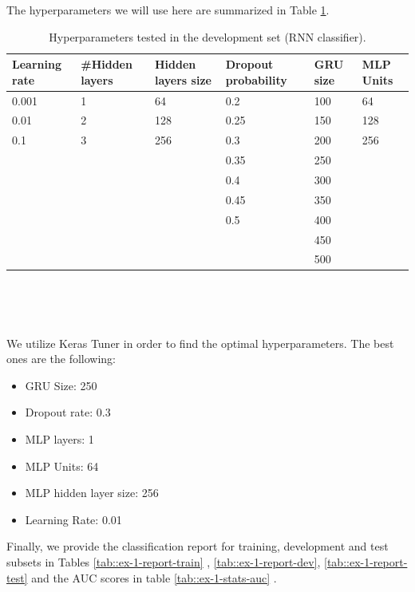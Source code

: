 \documentclass[10pt, a4paper]{article}
\begin{document}
	The hyperparameters we will use here are summarized in Table \ref{tab::ex-1-hyper}.
	
	\begin{table}
		\centering
		\begin{tabular}{|l|l|l|l|l|l|}
			\hline
			\rowcolor{blue!25}\textbf{Learning rate} & \cellcolor{blue!25}\textbf{\#Hidden layers} & \cellcolor{blue!25}\textbf{Hidden layers size} & \cellcolor{blue!25}\textbf{Dropout probability} & \cellcolor{blue!25}\textbf{GRU size}  & \cellcolor{blue!25}\textbf{MLP Units}\\
			\hline
			0.001 & 1 & 64 & 0.2 & 100 & 64\\
			\hline
			0.01 & 2 & 128 & 0.25 & 150 & 128\\
			\hline
			0.1 & 3 & 256 & 0.3 & 200 & 256 \\
			\hline 
			& & & 0.35 & 250 & \\
			\hline 
			& & & 0.4 & 300 &\\
			\hline 
			& & & 0.45 & 350 &\\
			\hline 
			& & & 0.5 & 400 &\\
			\hline 
			& & &  & 450 &\\
			\hline 
			& & & & 500 & \\
			
			
			
			\hline
		\end{tabular}
		\caption{Hyperparameters tested in the development set (RNN classifier).}
		\label{tab::ex-1-hyper}
	\end{table}
	
	\ 
	
	
	\
	
	We utilize Keras Tuner in order to find the optimal hyperparameters. The best ones are the following:
	\begin{itemize}
		\item GRU Size: 250
		\item Dropout rate: 0.3
		\item MLP layers: 1
		\item MLP Units: 64
		\item MLP hidden layer size: 256
		\item Learning Rate: 0.01
	\end{itemize}
	
	
	
	Finally, we provide the classification report for training, development and test subsets in Tables \ref{tab::ex-1-report-train} , \ref{tab::ex-1-report-dev}, \ref{tab::ex-1-report-test} and the AUC scores in table \ref{tab::ex-1-stats-auc} .
	
\end{document}
